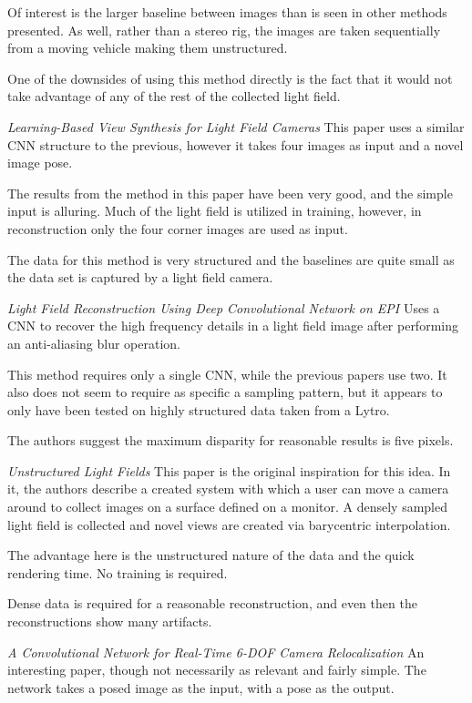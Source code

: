 \documentclass[12pt]{report}
\begin{document}
Of interest is the larger baseline between images than is seen in other methods presented. As well, rather than a stereo rig, the images are taken sequentially from a moving vehicle making them unstructured.

One of the downsides of using this method directly is the fact that it would not take advantage of any of the rest of the collected light field.

\emph{Learning-Based View Synthesis for Light Field Cameras}
This paper uses a similar CNN structure to the previous, however it takes four images as input and a novel image pose.

The results from the method in this paper have been very good, and the simple input is alluring. Much of the light field is utilized in training, however, in reconstruction only the four corner images are used as input.

The data for this method is very structured and the baselines are quite small as the data set is captured by a light field camera. 


\emph{Light Field Reconstruction Using Deep Convolutional Network on EPI}
Uses a CNN to recover the high frequency details in a light field image after performing an anti-aliasing blur operation. 

This method requires only a single CNN, while the previous papers use two. It also does not seem to require as specific a sampling pattern, but it appears to only have been tested on highly structured data taken from a Lytro. 

The authors suggest the maximum disparity for reasonable results is five pixels.

\emph{Unstructured Light Fields}
This paper is the original inspiration for this idea. In it, the authors describe a created system with which a user can move a camera around to collect images on a surface defined on a monitor. A densely sampled light field is collected and novel views are created via barycentric interpolation.

The advantage here is the unstructured nature of the data and the quick rendering time. No training is required.

Dense data is required for a reasonable reconstruction, and even then the reconstructions show many artifacts.  

\emph{A Convolutional Network for Real-Time 6-DOF Camera Relocalization}
An interesting paper, though not necessarily as relevant and fairly simple. The network takes a posed image as the input, with a pose as the output.
\end{document}
